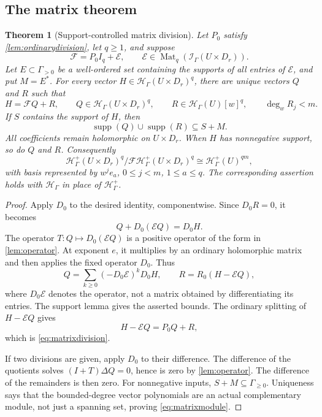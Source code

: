 \documentclass[11pt,oneside]{article}
\numberwithin{equation}{section}
\newtheorem{theorem}{Theorem}[section]
\theoremstyle{definition}
\theoremstyle{remark}\newtheorem{remark}[theorem]{Remark}
\newcommand{\HH}{\mathcal H_{\Gamma}}
\newcommand{\Hp}{\mathcal H^{+}_{\Gamma}}
\newcommand{\Ip}{\mathcal I_{\Gamma}}
\newcommand{\supp}{\operatorname{supp}}
\newcommand{\Mat}{\operatorname{Mat}}
\begin{document}
\subsection{The matrix theorem}
\begin{theorem}[Support-controlled matrix division]\label{thm:matrixdivision}
Let \(P_0\) satisfy \cref{lem:ordinarydivision}, let \(q\geq1\), and suppose
\[
 \mathcal F=P_0I_q+\mathcal E,
 \qquad \mathcal E\in\Mat_q(\Ip(U\times D_r)).
\]
Let \(E\subset\Gamma_{>0}\) be a well-ordered set containing the supports of all entries of \(\mathcal E\), and put \(M=E^*\). For every vector \(H\in\HH(U\times D_r)^q\), there are unique vectors \(Q\) and \(R\) such that
\begin{equation}\label{eq:matrixdivision}
 H=\mathcal FQ+R,
 \qquad Q\in\HH(U\times D_r)^q,
 \qquad R\in\HH(U)[w]^q,
 \qquad\deg_wR_j<m.
\end{equation}
If \(S\) contains the support of \(H\), then
\[
 \supp(Q)\cup\supp(R)\subseteq S+M.
\]
All coefficients remain holomorphic on \(U\times D_r\). When \(H\) has nonnegative support, so do \(Q\) and \(R\). Consequently
\begin{equation}\label{eq:matrixmodule}
 \Hp(U\times D_r)^q/
 \mathcal F\Hp(U\times D_r)^q
 \cong\Hp(U)^{qm},
\end{equation}
with basis represented by \(w^je_a\), \(0\leq j<m\), \(1\leq a\leq q\). The corresponding assertion holds with \(\HH\) in place of \(\Hp\).
\end{theorem}
\begin{proof}
Apply \(D_0\) to the desired identity, componentwise. Since \(D_0R=0\), it becomes
\[
 Q+D_0(\mathcal E Q)=D_0H.
\]
The operator \(T:Q\mapsto D_0(\mathcal E Q)\) is a positive operator of the form in \cref{lem:operator}. At exponent \(e\), it multiplies by an ordinary holomorphic matrix and then applies the fixed operator \(D_0\). Thus
\begin{equation}\label{eq:matrixQ}
 Q=\sum_{k\geq0}(-D_0\mathcal E)^kD_0H,
 \qquad R=R_0(H-\mathcal E Q),
\end{equation}
where \(D_0\mathcal E\) denotes the operator, not a matrix obtained by differentiating its entries. The support lemma gives the asserted bounds. The ordinary splitting of \(H-\mathcal E Q\) gives
\[
 H-\mathcal E Q=P_0Q+R,
\]
which is \eqref{eq:matrixdivision}.

If two divisions are given, apply \(D_0\) to their difference. The difference of the quotients solves \((I+T)\Delta Q=0\), hence is zero by \cref{lem:operator}. The difference of the remainders is then zero. For nonnegative inputs, \(S+M\subseteq\Gamma_{\geq0}\). Uniqueness says that the bounded-degree vector polynomials are an actual complementary module, not just a spanning set, proving \eqref{eq:matrixmodule}.
\end{proof}
\end{document}

